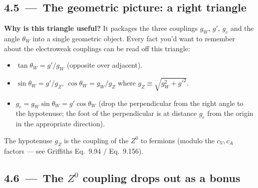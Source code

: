 \documentclass[11pt]{article}
\begin{document}
\subsection*{4.5 \,---\, The geometric picture: a right triangle}

\begin{center}
\end{center}

\begin{intuitionbox}
\textbf{Why is this triangle useful?} It packages the three couplings $g_W$, $g'$, $g_e$ and
the angle $\theta_W$ into a single geometric object. Every fact you'd want to remember
about the electroweak couplings can be read off this triangle:
\begin{itemize}[leftmargin=*]
  \item $\tan\theta_W = g'/g_W$ (opposite over adjacent).
  \item $\sin\theta_W = g'/g_Z$, $\cos\theta_W = g_W/g_Z$ where $g_Z \equiv \sqrt{g_W^2 + g'^2}$.
  \item $g_e = g_W \sin\theta_W = g' \cos\theta_W$ (drop the perpendicular from the right
        angle to the hypotenuse; the foot of the perpendicular is at distance $g_e$ from
        the origin in the appropriate direction).
\end{itemize}
The hypotenuse $g_Z$ is the coupling of the $Z^0$ to fermions (modulo the $c_V, c_A$
factors --- see Griffiths Eq.~9.94 / Eq.~9.156).
\end{intuitionbox}

\subsection*{4.6 \,---\, The $Z^0$ coupling drops out as a bonus}
\end{document}
